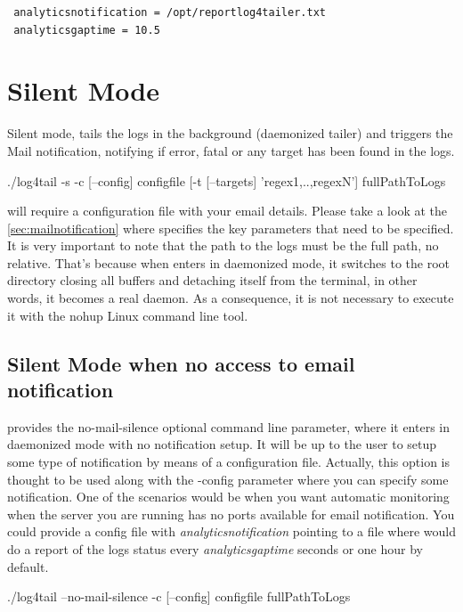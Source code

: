 \begin{config}
\begin{verbatim}
 analyticsnotification = /opt/reportlog4tailer.txt
 analyticsgaptime = 10.5
\end{verbatim}
\end{config}

\section{Silent Mode}
Silent mode, tails the logs in the background (daemonized tailer) and triggers
the Mail notification, notifying if error, fatal or any target has been found in the logs. 
\begin{cmd}
 ./log4tail -s -c [--config] configfile [-t [--targets] 'regex1,..,regexN'] fullPathToLogs
\end{cmd}
\logftailer{} will require a configuration file with your email details. Please take a look 
at the \autoref{sec:mailnotification} where specifies the key parameters 
that need to be specified. It is very important to note that the path to the logs must be the 
full path, no relative. That's because when \logftailer{} enters in daemonized mode, it switches 
to the root directory closing all buffers and detaching itself from the terminal, in other words, 
it becomes a real daemon. As a consequence, it is not necessary to execute it with the nohup 
Linux command line tool.

\subsection{Silent Mode when no access to email notification}
\logftailer{} provides the no-mail-silence optional command line parameter, where it enters in 
daemonized mode with no notification setup. It will be up to the user to setup some type of 
notification by means of a configuration file. Actually, this option is thought to be used along 
with the -config parameter where you can specify some notification. One of the scenarios would be 
when you want automatic monitoring when the server you are running \logftailer{} has no ports available 
for email notification. You could provide a config file with \emph{analyticsnotification} pointing to 
a file where \logftailer{} would do a report of the logs status every \emph{analyticsgaptime} seconds 
or one hour by default.

\begin{cmd}
 ./log4tail --no-mail-silence -c [--config] configfile fullPathToLogs
\end{cmd}


